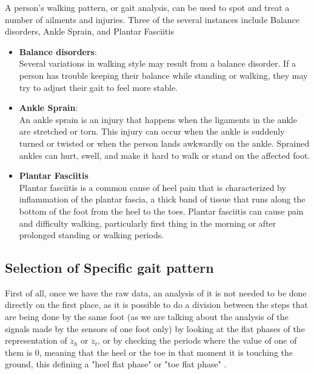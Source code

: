 A person's walking pattern, or gait analysis, can be used to spot and treat a number of ailments and injuries. Three of the several instances include Balance disorders, Ankle Sprain, and Plantar Fasciitis
\begin{itemize}
 
\item \textbf{Balance disorders}: \\
Several variations in walking style may result from a balance disorder. If a person has trouble keeping their balance while standing or walking, they may try to adjust their gait to feel more stable.

\item \textbf{Ankle Sprain}: \\
An ankle sprain is an injury that happens when the ligaments in the ankle are stretched or torn. This injury can occur when the ankle is suddenly turned or twisted or when the person lands awkwardly on the ankle. Sprained ankles can hurt, swell, and make it hard to walk or stand on the affected foot.

\item \textbf{Plantar Fasciitis} \\
Plantar fasciitis is a common cause of heel pain that is characterized by inflammation of the plantar fascia, a thick band of tissue that runs along the bottom of the foot from the heel to the toes. Plantar fasciitis can cause pain and difficulty walking, particularly first thing in the morning or after prolonged standing or walking periods.


\end{itemize}

\subsection{Selection of Specific gait pattern}
\label{subsection:Selection of Specific gait pattern}

First of all, once we have the raw data, an analysis of it is not needed to be done directly on the first place, as it is possible to do a division between the steps that are being done by the same foot (as we are talking about the analysis of the signals made by the sensors of one foot only) by looking at the flat phases of the representation of $\ddot{z}_h$ or $\ddot{z}_t$, or by checking the periods where the value of one of them is 0, meaning that the heel or the toe in that moment it is touching the ground, this defining a "heel flat phase" or "toe flat phase" \cite{Mohamed2015}.

